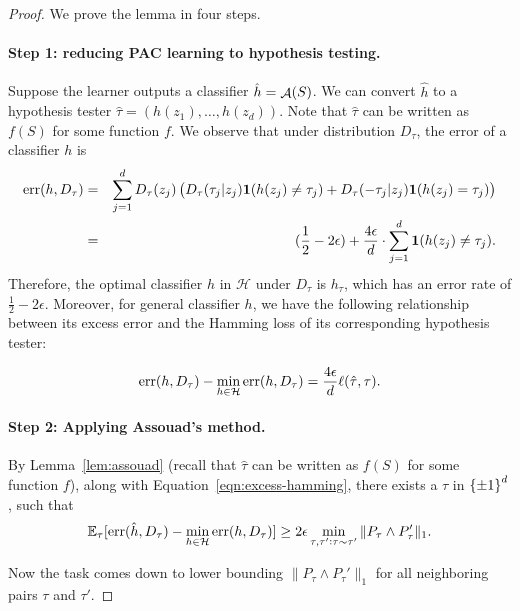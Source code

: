 \documentclass{article}
\DeclareMathOperator*{\err}{{\rm err}}
\DeclareMathOperator*{\Acal}{{\cal A}}
\newcommand{\EE}{\mathbb{E}}
\newcommand{\Hcal}{\mathcal{H}}
\newcommand*{\one}{{\bf 1}}
\begin{document}
\begin{proof} We prove the lemma in four steps.
\paragraph{Step 1: reducing PAC learning to hypothesis testing.} Suppose the learner outputs a classifier $\hat{h} = \Acal(S)$. We can convert $\hat{h}$ to a hypothesis tester $\hat{\tau} = (h(z_1), \ldots, h(z_d))$. Note that $\hat{\tau}$ can be written as $f(S)$ for some function $f$.
We observe that under distribution $D_\tau$, the error of a classifier $h$ is
\begin{eqnarray*}
\err(h, D_\tau)
&=& \sum_{j=1}^d D_\tau(z_j) \del{D_\tau(\tau_j|z_j) \one(h(z_j) \neq \tau_j) +
D_\tau(-\tau_j|z_j) \one(h(z_j) = \tau_j)} \\
&=& (\frac12 - 2\epsilon) + \frac{4\epsilon}{d} \cdot \sum_{j=1}^d \one(h(z_j) \neq \tau_j).
\end{eqnarray*}
Therefore, the optimal classifier $h$ in $\Hcal$ under $D_\tau$ is $h_\tau$, which has an
error rate of $\frac12 - 2\epsilon$. Moreover, for general classifier $h$, we have the following relationship between its excess error and the Hamming loss of its corresponding hypothesis tester:

\begin{equation}
  \err(h, D_\tau) - \min_{h \in \Hcal} \err(h, D_\tau) = \frac{4\epsilon}{d} \ell(\hat{\tau}, \tau).
  \label{eqn:excess-hamming}
\end{equation}

\paragraph{Step 2: Applying Assouad's method.} By Lemma~\ref{lem:assouad} (recall that $\hat{\tau}$ can be written as $f(S)$ for some function $f$), along with Equation~\eqref{eqn:excess-hamming}, there exists a $\tau$ in $\cbr{\pm 1}^d$, such that
\begin{equation}
  \EE_\tau[\err(\hat{h}, D_\tau) - \min_{h \in \Hcal} \err(h, D_\tau)] \geq 2 \epsilon \min_{\tau, \tau': \tau \sim \tau'} \| P_\tau \wedge P_\tau' \|_1.
  \label{eqn:excess-sim}
\end{equation}

Now the task comes down to lower bounding $\| P_\tau \wedge P_\tau' \|_1$ for all neighboring
pairs $\tau$ and $\tau'$.


\end{proof}
\end{document}
